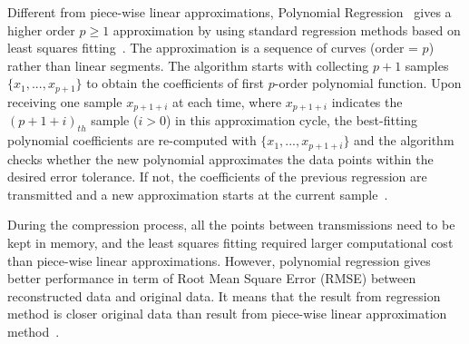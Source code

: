 Different from piece-wise linear approximations, Polynomial
Regression~\cite{zordan2014performance} gives a higher order $p \geqslant1$
approximation by using standard regression methods based on least squares
fitting~\cite{phillips2003interpolation}. The approximation is a sequence of
curves (order = $p$) rather than linear segments. The algorithm starts with
collecting $p+1$ samples $\{x_1, ..., x_{p+1} \}$ to obtain the coefficients of
first $p$-order polynomial function. Upon receiving one sample $x_{p+1+i}$ at
each time, where $x_{p+1+i}$ indicates the $(p+1+i)_{th}$ sample ($i>0$) in this
approximation cycle, the best-fitting polynomial coefficients are re-computed
with $\{ x_1, ..., x_{p+1+i}\}$ and the algorithm checks whether the new
polynomial approximates the data points within the desired error tolerance. If
not, the coefficients of the previous regression are transmitted and a new
approximation starts at the current sample~\cite{zordan2014performance}. 

During the compression process, all the points between transmissions need to be
kept in memory, and the least squares fitting required larger computational cost
than piece-wise linear approximations. However, polynomial regression gives
better performance in term of Root Mean Square Error (RMSE) between
reconstructed data and original data. It means that the result from regression
method is closer original data than result from piece-wise linear approximation
method~\cite{zordan2014performance}.



